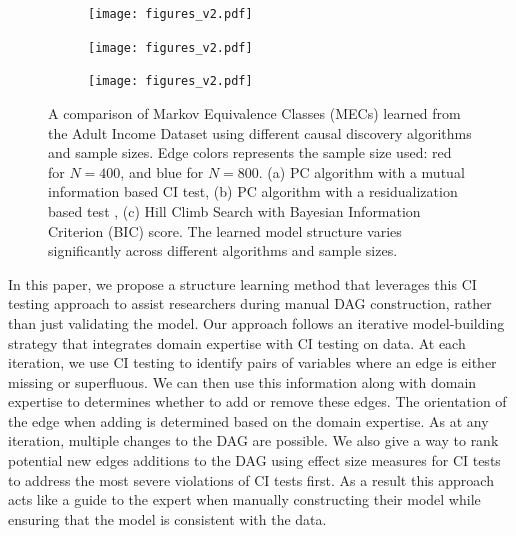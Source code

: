\documentclass{uai2025} %
\begin{document}

\begin{figure}[t!]
    \begin{subfigure}{0.5 \textwidth}
	\centering
    	\texttt{[image: figures\_v2.pdf]}
    	\caption{}
    \end{subfigure}
    \begin{subfigure}{0.5\textwidth}
	\centering
    	\texttt{[image: figures\_v2.pdf]}
    	\caption{}
    \end{subfigure}
    \begin{subfigure}{0.5\textwidth}
	\centering
    	\texttt{[image: figures\_v2.pdf]}
    	\caption{}
    \end{subfigure}

    \caption{A comparison of Markov Equivalence Classes (MECs) learned from the Adult
	     Income Dataset \citep{Becker1996} using different causal discovery
	     algorithms and sample sizes. Edge colors represents the sample size
	     used: red for $N=400$, and blue for $N=800$. (a) PC algorithm with a
	     mutual information based CI test, (b) PC algorithm with a
    	     residualization based test \citep{Ankan2023}, (c) Hill Climb Search with
	     Bayesian Information Criterion (BIC) score. The learned model structure varies
             significantly across different algorithms and sample sizes.}
    \label{fig:intro}
\end{figure}

In this paper, we propose a structure learning method that leverages this CI
testing approach to assist researchers during manual DAG construction, rather
than just validating the model. Our approach follows an iterative
model-building strategy that integrates domain expertise with CI testing on
data. At each iteration, we use CI testing to identify pairs of variables where
an edge is either missing or superfluous. We can then use this information
along with domain expertise to determines whether to add or remove these edges.
The orientation of the edge when adding is determined based on the domain
expertise. As at any iteration, multiple changes to the DAG are possible. We
also give a way to rank potential new edges additions to the DAG using effect
size measures for CI tests to address the most severe violations of CI tests
first. As a result this approach acts like a guide to the expert when manually
constructing their model while ensuring that the model is consistent with the
data. 
\end{document}
